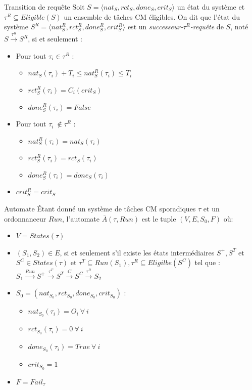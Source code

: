 \documentclass{bredelebeamer}
\begin{document}
\begin{frame}{Transition de requête}
Soit $S = \langle nat_S, rct_S, done_S, crit_S \rangle$ un état du système et $\tau^R \subseteq Eligible(S)$ un ensemble de tâches CM éligibles. On dit que l'état du système $S^R = \langle nat_S^R, rct_S^R, done_S^R, crit_S^R \rangle$ est un \textit{successeur-$\tau^R$-requête} de $S$, noté $S\xrightarrow{\tau^R}S^R$, si et seulement :
\begin{itemize}
\item Pour tout $\tau_i \in \tau^R$ :\begin{itemize}
    \item $nat_S(\tau_i)+T_i \leq nat_S^R(\tau_i) \leq T_i$
    \item $rct_S^R(\tau_i)=C_i(crit_S)$
    \item $done_S^R(\tau_i) = False$
\end{itemize}
\item Pour tout $\tau_i\ \notin \tau^R$ :\begin{itemize}
    \item $nat_S^R(\tau_i)=nat_S(\tau_i)$
    \item $rct_S^R(\tau_i)=rct_S(\tau_i)$
    \item $done_S^R(\tau_i) = done_S(\tau_i)$
\end{itemize}
\item $crit_S^R = crit_S$\\
\end{itemize}
\end{frame}

\begin{frame}{Automate}
Étant donné un système de tâches CM sporadiques $\tau$ et un ordonnanceur $Run$, l'automate $\overline{A}(\tau,Run)$ est le tuple $(V, E, S_0, F)$ où:
\begin{itemize}
\item  $V=States(\tau)$
\item $(S_1,S_2) \in E$, si et seulement s'il existe les états intermédiaires $S^{+}, S^{T}$ et $S^{C} \in States(\tau)$ et $\tau^T \subseteq Run(S_1),\tau^R \subseteq Eligilbe(S^{C}) $ tel que : \\$S_1\xrightarrow{Run}S^{+}\xrightarrow{\tau^T}S^{T}\xrightarrow{C}S^{C}\xrightarrow{\tau^R}S_2$
\item $S_0 = (nat_{S_0}, rct_{S_0}, done_{S_0}, crit_{S_0})$ :\begin{itemize}
\item $nat_{S_0}(\tau_i) = O_i\ \forall\ i$
\item $rct_{S_0}(\tau_i) = 0\ \forall\ i$
\item $done_{S_0}(\tau_i) = True\ \forall\ i$
\item $crit_{S_0} = 1$
\end{itemize}
\item $F = Fail_\tau$
\end{itemize}
\end{frame}
\end{document}
